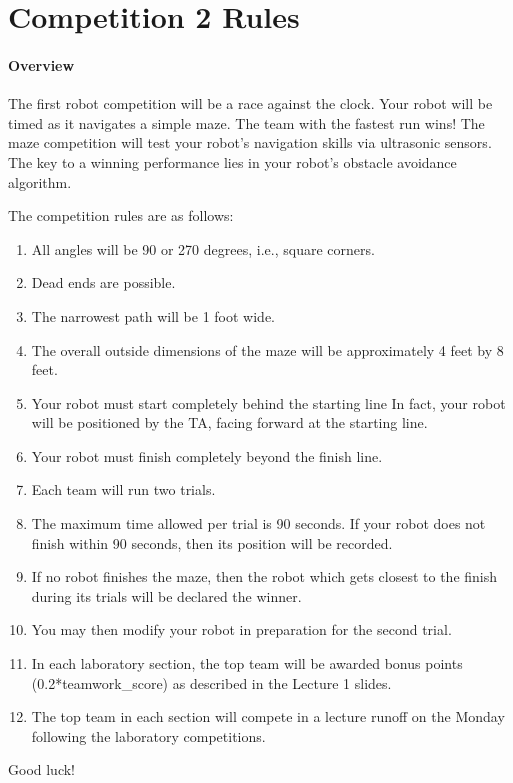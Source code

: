 
\section{Competition 2 Rules}

\paragraph{Overview}The first robot competition will be a race against the clock. Your robot will be timed as it navigates a  simple maze. The team with the fastest run wins! 
The maze competition will test your robot's navigation skills via ultrasonic sensors. The key to a winning performance lies in your robot's obstacle avoidance algorithm. 


The competition rules are as follows:
\begin{enumerate}
	\item All angles will be 90 or 270 degrees, i.e., square corners. 
	\item Dead ends are possible. 
	\item The narrowest path will be 1 foot wide. 
	\item The overall outside dimensions of the maze will be approximately 4 feet by 8 feet.
	\item Your robot must start completely behind the starting line In fact, your robot will be positioned by the TA, facing forward at the starting line. 
	\item Your robot must finish completely beyond the finish line.
	\item Each team will run two trials. 
	\item The maximum time allowed per trial is 90 seconds. If your robot does not finish within 90 seconds, then its position will be recorded. 
	\item If no robot finishes the maze, then the robot which gets closest to the finish during its trials will be declared the winner. 
	\item You may then modify your robot in preparation for the second trial.
	\item In each laboratory section, the top team will be awarded bonus points (0.2*teamwork\_score) as described in the Lecture 1 slides. 
	\item The top team in each section will compete in a lecture runoff on the  Monday following the laboratory competitions. 
	
	
\end{enumerate}
Good luck!